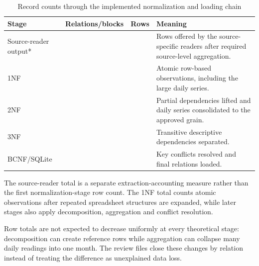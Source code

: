 \begin{table}[H]
\centering
\caption{Record counts through the implemented normalization and loading chain}
\label{tab:etl-accounting}
\begin{tabular}{L{0.22\textwidth}r r L{0.38\textwidth}}
\toprule
Stage & Relations/blocks & Rows & Meaning \\
\midrule
Source-reader output* & \mSourceBlocks{} & \mRowsOffered{} & Rows offered by the
source-specific readers after required source-level aggregation. \\
1NF & \mOneNFRels{} & \mOneNFRows{} & Atomic row-based observations,
including the large daily series. \\
2NF & \mTwoNFRels{} & \mTwoNFRows{} & Partial dependencies lifted and daily
series consolidated to the approved grain. \\
3NF & \mThreeNFRels{} & \mThreeNFRows{} & Transitive descriptive dependencies
separated. \\
BCNF/SQLite & \mBCNFRels{} & \mBCNFRows{} & Key conflicts resolved and final
relations loaded. \\
\bottomrule
\end{tabular}
\end{table}

The source-reader total is a separate extraction-accounting measure rather than
the first normalization-stage row count. The 1NF total counts atomic
observations after repeated spreadsheet structures are expanded, while later
stages also apply decomposition, aggregation and conflict resolution.

Row totals are not expected to decrease uniformly at every theoretical stage:
decomposition can create reference rows while aggregation can collapse many
daily readings into one month. The review files close these changes by relation
instead of treating the difference as unexplained data loss.
